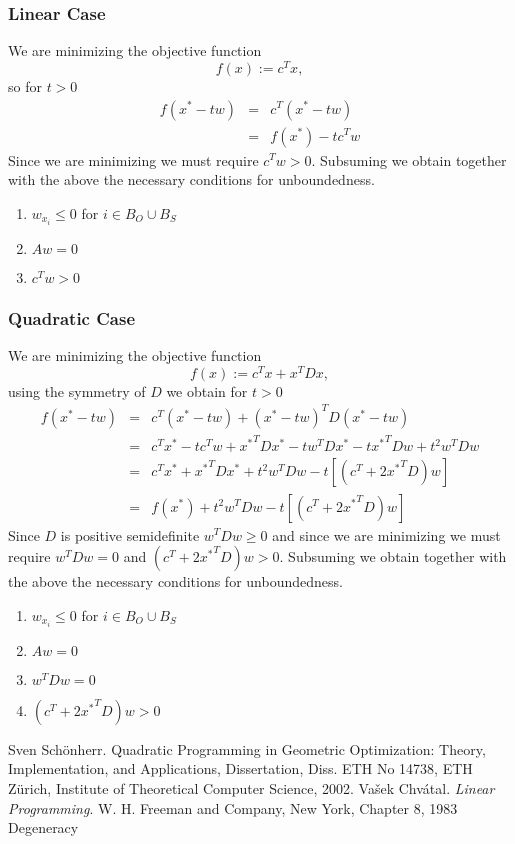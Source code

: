 \documentclass[a4paper]{article}
\begin{document}
\subsubsection{Linear Case}
We are minimizing the objective function
\begin{equation}
f\left(x\right):=c^{T}x,
\end{equation}
so for $t>0$
\begin{eqnarray}
f(x^{*}-tw)
&=&
c^{T}\left(x^{*}-tw\right)
\nonumber \\
&=&
f\left(x^{*}\right) -tc^{T}w
\end{eqnarray}
Since we are minimizing we must require $c^{T}w>0$.
Subsuming we obtain together with the above the necessary conditions for
unboundedness. 
\begin{enumerate}	
\item $w_{x_{i}} \leq 0$ for $i \in B_{O} \cup B_{S}$
\item $Aw=0$
\item $c^{T}w>0$
\end{enumerate}

\subsubsection{Quadratic Case}
We are minimizing the objective function
\begin{equation}
f\left(x\right):=c^{T}x+x^{T}Dx,
\end{equation}
using the symmetry of $D$ we obtain for $t>0$
\begin{eqnarray}
f(x^{*}-tw)
&=&
c^{T}\left(x^{*}-tw\right)
 +\left(x^{*}-tw\right)^{T}D\left(x^{*}-tw\right)
\nonumber \\
&=&
c^{T}x^{*} - tc^{T}w + {x^{*}}^{T}Dx^{*} - tw^{T}Dx^{*}-t{x^{*}}^{T}Dw
 +t^{2}w^{T}Dw
\nonumber \\
&=&
c^{T}x^{*} + {x^{*}}^{T}Dx^{*} + t^{2}w^{T}Dw
 -t\left[\left(c^{T}+2{x^{*}}^{T}D\right)w\right]
\nonumber \\
&=&
f\left(x^{*}\right) + t^{2}w^{T}Dw
 -t\left[\left(c^{T}+2{x^{*}}^{T}D\right)w\right]
\end{eqnarray}
Since $D$ is positive semidefinite $w^{T}Dw \geq 0$ and since we are minimizing
we must require $w^{T}Dw=0$ and $\left(c^{T}+2{x^{*}}^{T}D\right)w>0$.
Subsuming we obtain together with the above the necessary conditions for
unboundedness.
\begin{enumerate}
\item $w_{x_{i}} \leq 0$ for $i \in B_{O} \cup B_{S}$
\item $Aw=0$
\item $w^{T}Dw = 0$
\item $\left(c^{T}+2{x^{*}}^{T}D\right)w>0$
\end{enumerate}
\begin{thebibliography}{99}
 Sven Sch\"{o}nherr. Quadratic Programming in Geometric Optimization:
Theory, Implementation, and Applications, Dissertation, Diss. ETH No 14738, ETH
Z\"{u}rich, Institute of Theoretical Computer Science, 2002.
 Va\v{s}ek Chv\'{a}tal. \textit{Linear Programming}. W. H. Freeman and Company,
New York, Chapter 8, 1983 
 Degeneracy
\end{thebibliography}
\end{document}
